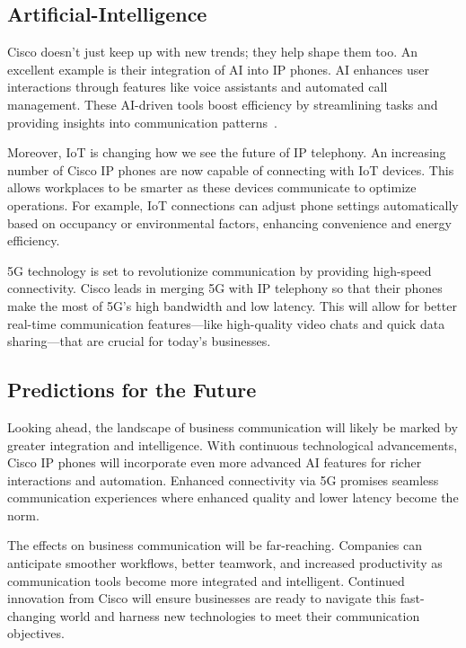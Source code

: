 \documentclass[11pt,a4paper]{article}
\begin{document}
\subsection*{Artificial-Intelligence}

Cisco doesn’t just keep up with new trends; they help shape them too. An excellent example is their integration of AI into IP phones. AI enhances user interactions through features like voice assistants and automated call management. These AI-driven tools boost efficiency by streamlining tasks and providing insights into communication patterns~\cite{Artificial-Intelligence}.


Moreover, IoT is changing how we see the future of IP telephony. An increasing number of Cisco IP phones are now capable of connecting with IoT devices. This allows workplaces to be smarter as these devices communicate to optimize operations. For example, IoT connections can adjust phone settings automatically based on occupancy or environmental factors, enhancing convenience and energy efficiency.

5G technology is set to revolutionize communication by providing high-speed connectivity. Cisco leads in merging 5G with IP telephony so that their phones make the most of 5G's high bandwidth and low latency. This will allow for better real-time communication features—like high-quality video chats and quick data sharing—that are crucial for today’s businesses.

\subsection*{Predictions for the Future}

Looking ahead, the landscape of business communication will likely be marked by greater integration and intelligence. With continuous technological advancements, Cisco IP phones will incorporate even more advanced AI features for richer interactions and automation. Enhanced connectivity via 5G promises seamless communication experiences where enhanced quality and lower latency become the norm.

The effects on business communication will be far-reaching. Companies can anticipate smoother workflows, better teamwork, and increased productivity as communication tools become more integrated and intelligent. Continued innovation from Cisco will ensure businesses are ready to navigate this fast-changing world and harness new technologies to meet their communication objectives.
\end{document}

